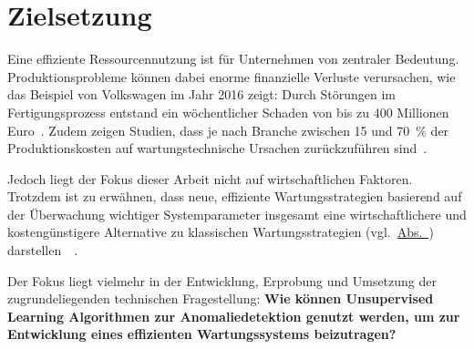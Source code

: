 \chapter{Zielsetzung}\label{ch:zielsetzung}
Eine effiziente Ressourcennutzung ist für Unternehmen von zentraler Bedeutung. Produktionsprobleme können dabei enorme finanzielle
Verluste verursachen, wie das Beispiel von Volkswagen im Jahr 2016 zeigt: Durch Störungen im Fertigungsprozess entstand ein wöchentlicher
Schaden von bis zu 400 Millionen Euro~\cite{Krupitzer2020}. Zudem zeigen Studien, dass je nach Branche zwischen 15 und 70~\% der
Produktionskosten auf wartungstechnische Ursachen zurückzuführen sind~\cite{Bevilacqua2000}.

Jedoch liegt der Fokus dieser Arbeit nicht auf wirtschaftlichen Faktoren. Trotzdem ist zu erwähnen, dass neue, effiziente
Wartungsstrategien basierend auf der Überwachung wichtiger Systemparameter insgesamt eine wirtschaftlichere und kostengünstigere
Alternative zu klassischen Wartungsstrategien (vgl.~\hyperref[sec:trad_maintenance]{Abs.~})
darstellen~\cite{Deloux2009}~\Cite[S.~64--65]{Mobley2002}.

Der Fokus liegt vielmehr in der Entwicklung, Erprobung und Umsetzung der zugrundeliegenden technischen Fragestellung: \textbf{Wie können
Unsupervised Learning Algorithmen zur Anomaliedetektion genutzt werden, um zur Entwicklung eines effizienten Wartungssystems
beizutragen?}

